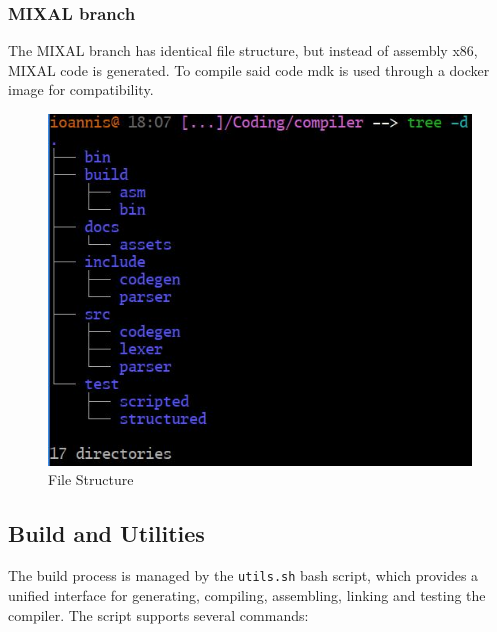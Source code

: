 \documentclass{article}
\begin{document}
    \subsubsection*{MIXAL branch}
    The MIXAL branch has identical file structure, but instead of assembly x86, MIXAL code is generated. To compile said code mdk is used through a docker image for compatibility\cite{GNU MDK}.
    
    \begin{figure} [h]
        \centering
        \includegraphics[width=0.75\linewidth]{assets/file-structure.png}
        \caption{File Structure}
        \label{fig:enter-label}
    \end{figure}
    
    \newpage
    \subsection{Build and Utilities} 
    The build process is managed by the \texttt{utils.sh} bash script, which provides a unified interface for generating, compiling, assembling, linking and testing the compiler. The script supports several commands:
\end{document}

